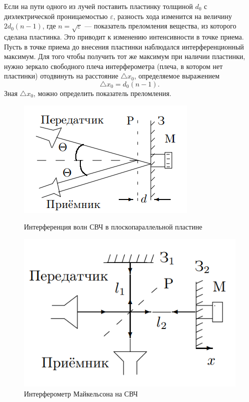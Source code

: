 \documentclass[a4paper]{article}
\begin{document}
Если на пути одного из лучей поставить пластинку толщиной $d_0$ с диэлектрической проницаемостью $\varepsilon$, разность хода изменится
на величину $2 d_0 (n−1)$, где $n = \sqrt{\varepsilon}$ —
показатель преломления вещества,
из которого сделана пластинка. Это
приводит к изменению интенсивности в точке приема. Пусть в точке приема до внесения пластинки наблюдался интерференционный максимум. Для того чтобы получить тот же максимум при наличии пластинки, нужно зеркало свободного плеча интерферометра (плеча, в котором нет пластинки) отодвинуть на расстояние $\triangle x_0$, определяемое выражением
\begin{equation}
    \triangle x_0 = d_0 (n-1).
\end{equation}
Зная $\triangle x_0$, можно определить показатель преломления.

\begin{figure}[h]
\begin{center}
\begin{minipage}[h]{0.45\linewidth}
\includegraphics[width=1\linewidth]{fig2.PNG}
\caption{Интерференция волн СВЧ в плоскопараллельной пластине} %
\label{ris:experimoriginal} %
\end{minipage}
\hfill 
\begin{minipage}[h]{0.45\linewidth}
\includegraphics[width=1\linewidth]{fig3.PNG}
\caption{Интерферометр Майкельсона на СВЧ}
\label{ris:experimcoded}
\end{minipage}
\end{center}
\end{figure}
\end{document}
